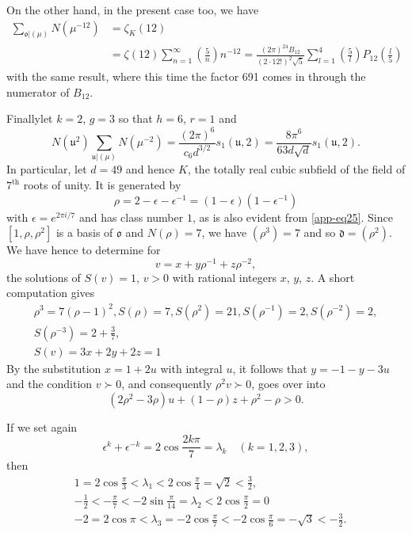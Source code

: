 On the other hand, in the present case too, we have
\begin{align*}
\sum_{\mathfrak{o}|(\mu)}N(\mu^{-12}) &= \zeta_{K}(12)\\
&=
\zeta(12)\sum^{\infty}_{n=1}\left(\frac{5}{n}\right)n^{-12}=\frac{(2\pi)^{24}B_{12}}{(2\cdot
  12!)^{2}\sqrt{5}}\sum^{4}_{l=1}\left(\frac{5}{l}\right)P_{12}\left(\frac{l}{5}\right) 
\end{align*}
with the same result, where this time the factor 691 comes in through
the numerator of $B_{12}$.

Finally\pageoriginale let $k=2$, $g=3$ so that $h=6$, $r=1$ and
$$
N(\mathfrak{u}^{2})\sum_{\mathfrak{u}|(\mu)}N(\mu^{-2})=\frac{(2\pi)^{6}}{c_{6}d^{3/2}}s_{1}(\mathfrak{u},2)=\frac{8\pi^{6}}{63d\sqrt{d}}s_{1}(\mathfrak{u},2). 
$$
In particular, let $d=49$ and hence $K$, the totally real cubic
subfield of the field of $7^{\text{th}}$ roots of unity. It is
generated by
$$
\rho=2-\epsilon-\epsilon^{-1}=(1-\epsilon)(1-\epsilon^{-1})
$$
with $\epsilon=e^{2\pi i/7}$ and has class number $1$, as is also
evident from \eqref{app-eq25}. Since $[1,\rho,\rho^{2}]$ is a basis of
$\mathfrak{o}$ and $N(\rho)=7$, we have $(\rho^{3})=7$ and so
$\mathfrak{d}=(\rho^{2})$. We have hence to determine for
$$
v=x+y\rho^{-1}+z\rho^{-2},
$$
the solutions of $S(v)=1$, $v>0$ with rational integers $x$, $y$,
$z$. A short computation gives
\begin{gather*}
\rho^{3}=7(\rho-1)^{2},S(\rho)=7,S(\rho^{2})=21,S(\rho^{-1})=2,S(\rho^{-2})=2,\\
S(\rho^{-3})=2+\frac{3}{7},\\
S(v) =3x+2y+2z=1
\end{gather*}
By the substitution $x=1+2u$ with integral $u$, it follows that
$y=-1-y-3u$ and the condition $v \succ 0$, and consequently $\rho^{2}v
\succ 0$,
goes over into
\begin{equation*}
(2\rho^{2}-3\rho)u+(1-\rho)z+\rho^{2}-\rho>0.\tag{27}\label{app-eq27}
\end{equation*}

If we set again
$$
\epsilon^{k}+\epsilon^{-k}=2\cos \frac{2k\pi}{7}=\lambda_{k}\quad
(k=1,2,3),
$$
then
\begin{align*}
& 1=2\cos \frac{\pi}{3}<\lambda_{1}<2\cos
\frac{\pi}{4}=\sqrt{2}<\frac{3}{2},\\
&
-\frac{1}{2}<-\frac{\pi}{7}<-2\sin\frac{\pi}{14}=\lambda_{2}<2\cos\frac{\pi}{2}=0\\
& -2=2\cos
\pi<\lambda_{3}=-2\cos\frac{\pi}{7}<-2\cos\frac{\pi}{6}=-\sqrt{3}<-\frac{3}{2}. 
\end{align*}\pageoriginale

